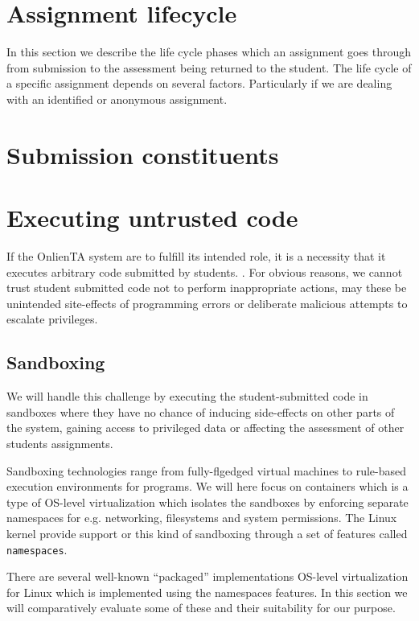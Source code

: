 \section{Assignment lifecycle}
In this section we describe the life cycle phases which an assignment
goes through from submission to the assessment being returned to the
student. The life cycle of a specific assignment depends on several
factors. Particularly if we are dealing with an identified or
anonymous assignment.

\section{Submission constituents}


\section{Executing untrusted code}
If the OnlienTA system are to fulfill its intended role, it is a
necessity that it executes arbitrary code submitted by
students. . For obvious reasons, we cannot trust
student submitted code not to perform inappropriate actions, may these
be unintended site-effects of programming errors or deliberate
malicious attempts to escalate privileges.


\subsection{Sandboxing}
We will handle this challenge by executing the student-submitted code
in sandboxes where they have no chance of inducing side-effects on
other parts of the system, gaining access to privileged data or
affecting the assessment of other students assignments.


Sandboxing technologies range from fully-flgedged virtual machines to
rule-based execution environments for programs. We will here focus on
containers which is a type of OS-level virtualization which isolates
the sandboxes by enforcing separate namespaces for e.g. networking,
filesystems and system permissions. The Linux kernel provide support
or this kind of sandboxing through a set of features called
\texttt{namespaces}\cite{namespaces}.

There are several well-known "`packaged"' implementations OS-level
virtualization for Linux which is implemented using the namespaces
features. In this section we will comparatively evaluate some of these
and their suitability for our purpose.



